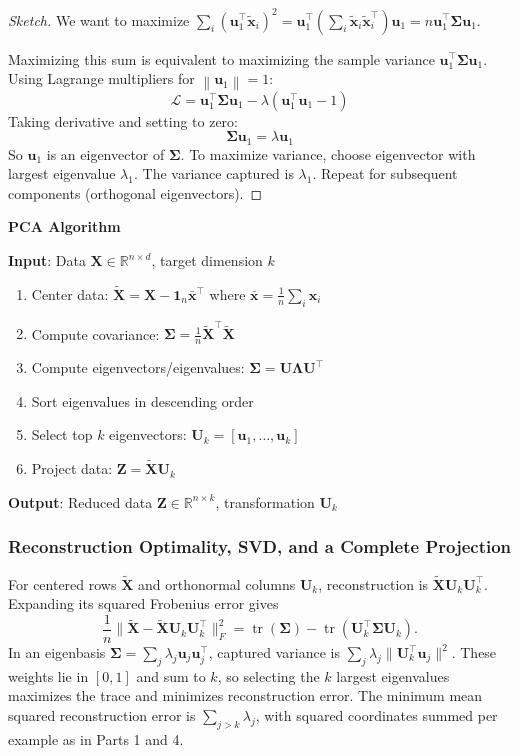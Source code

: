 \documentclass[11pt,twoside]{article}
\numberwithin{equation}{section}
\newcommand{\R}{\mathbb{R}}
\newcommand{\vect}[1]{\bm{#1}}
\newcommand{\mat}[1]{\bm{#1}}
\newcommand{\norm}[1]{\left\lVert#1\right\rVert}
\theoremstyle{plain}
\theoremstyle{definition}
\theoremstyle{remark}
\begin{document}
\begin{proof}[Sketch]
We want to maximize $\sum_i (\vect{u}_1^\top \tilde{\vect{x}}_i)^2 = \vect{u}_1^\top \left(\sum_i \tilde{\vect{x}}_i\tilde{\vect{x}}_i^\top\right)\vect{u}_1 = n\vect{u}_1^\top \mat{\Sigma} \vect{u}_1$.

Maximizing this sum is equivalent to maximizing the sample variance $\vect{u}_1^\top\mat{\Sigma}\vect{u}_1$. Using Lagrange multipliers for $\norm{\vect{u}_1}=1$:
\[
\mathcal{L} = \vect{u}_1^\top \mat{\Sigma} \vect{u}_1 - \lambda(\vect{u}_1^\top\vect{u}_1 - 1)
\]
Taking derivative and setting to zero:
\[
\mat{\Sigma}\vect{u}_1 = \lambda\vect{u}_1
\]
So $\vect{u}_1$ is an eigenvector of $\mat{\Sigma}$. To maximize variance, choose eigenvector with largest eigenvalue $\lambda_1$. The variance captured is $\lambda_1$. Repeat for subsequent components (orthogonal eigenvectors).
\end{proof}

\begin{algorithmbox}
\textbf{PCA Algorithm}

\textbf{Input}: Data $\mat{X} \in \R^{n \times d}$, target dimension $k$

\begin{enumerate}
\item Center data: $\tilde{\mat{X}}=\mat{X}-\mathbf{1}_n\bar{\vect{x}}^\top$ where $\bar{\vect{x}} = \frac{1}{n}\sum_i \vect{x}_i$
\item Compute covariance: $\mat{\Sigma} = \frac{1}{n}\tilde{\mat{X}}^\top\tilde{\mat{X}}$
\item Compute eigenvectors/eigenvalues: $\mat{\Sigma} = \mat{U}\mat{\Lambda}\mat{U}^\top$
\item Sort eigenvalues in descending order
\item Select top $k$ eigenvectors: $\mat{U}_k = [\vect{u}_1, \ldots, \vect{u}_k]$
\item Project data: $\mat{Z} = \tilde{\mat{X}}\mat{U}_k$
\end{enumerate}

\textbf{Output}: Reduced data $\mat{Z} \in \R^{n \times k}$, transformation $\mat{U}_k$
\end{algorithmbox}

\subsubsection{Reconstruction Optimality, SVD, and a Complete Projection}
\label{sec:pca-worked}
For centered rows $\tilde{\mat X}$ and orthonormal columns $\mat U_k$, reconstruction is $\tilde{\mat X}\mat U_k\mat U_k^\top$. Expanding its squared Frobenius error gives
\[
\frac1n\|\tilde{\mat X}-\tilde{\mat X}\mat U_k\mat U_k^\top\|_F^2
=\operatorname{tr}(\mat\Sigma)-\operatorname{tr}(\mat U_k^\top\mat\Sigma\mat U_k).
\]
In an eigenbasis $\mat\Sigma=\sum_j\lambda_j\vect u_j\vect u_j^\top$, captured variance is $\sum_j\lambda_j\|\mat U_k^\top\vect u_j\|^2$. These weights lie in $[0,1]$ and sum to $k$, so selecting the $k$ largest eigenvalues maximizes the trace and minimizes reconstruction error. The minimum mean squared reconstruction error is $\sum_{j>k}\lambda_j$, with squared coordinates summed per example as in Parts 1 and 4.
\end{document}
